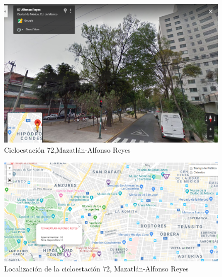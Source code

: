 \documentclass[9pt,twocolumn,twoside]{ilcss}
\begin{document}
\begin{appendices}
\begin{figure}[tbhp]
	\centering
	\includegraphics[width=0.9\linewidth]{Paper/images/estacion72.png}
	\caption{Cicloestación 72,Mazatlán-Alfonso Reyes}
	\label{fig:pen_habs_penbc72}
\end{figure}
\begin{figure}[tbhp]
	\centering
	\includegraphics[width=0.9\linewidth]{Paper/images/estacion72_mapa.png}
	\caption{ Localización de la cicloestación 72, Mazatlán-Alfonso Reyes}
	\label{fig:pen_habs_penbc72loc}
\end{figure}


\end{appendices}
\end{document}
